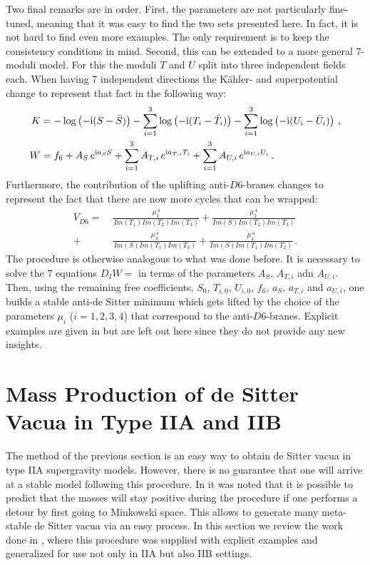 \documentclass[12pt]{report}
\newcommand{\bea}{\begin{equation}\begin{aligned}}
\newcommand{\eea}{\end{aligned}\end{equation}}
\def\rmi{{\rm i}}
\begin{document}
Two final remarks are in order. First, the parameters are not particularly fine-tuned, meaning that it was easy to find the two sets presented here. In fact, it is not hard to find even more examples. The only requirement is to keep the consistency conditions in mind. Second, this can be extended to a more general 7-moduli model. For this the moduli $T$ and $U$ split into three independent fields each. When having 7 independent directions the Kähler- and superpotential change to represent that fact in the following way:
\bea 
K&=  - \log\left(-\rmi (S-\bar{S})\right) - \sum_{i=1}^3  \log\left(-\rmi (T_i-\bar{T}_i)\right) - \sum_{i=1}^3 \log\left(-\rmi (U_i-\bar{U}_i)\right)\,,\\
W& = f_6 + A_{S}\, e^{\rmi a_S S} +  \sum_{i=1}^3 A_{T,i}\, e^{\rmi a_{T,i} T_i}+ \sum_{i=1}^3 A_{U,i}\, e^{\rmi a_{U,i} U_i}\,.
\eea
Furthermore, the contribution of the uplifting anti-$D6$-branes changes to represent the fact that there are now more cycles that can be wrapped:
\bea
V_{\overline{D6}} =\; &\frac{\mu_1^{\,4}}{Im(T_1)  Im(T_2)  Im(T_3)} +\frac{\mu_2^{\,4}}{Im(S)  Im(T_2)  Im(T_3)} \\+&\frac{\mu_3^{\,4}}{Im(S)  Im(T_1)  Im(T_3)} +\frac{\mu_4^{\,4}}{Im(S)  Im(T_1)  Im(T_2)}\,.
\eea
The procedure is otherwise analogous to what was done before. It is necessary to solve the 7 equations $D_IW=$ in terms of the parameters $A_S$, $A_{T,i}$ adn $A_{U,i}$. Then, using the remaining free coefficients, $S_0$, $T_{i,0}$, $U_{i,0}$, $f_6$, $a_S$, $a_{T,i}$ and $a_{U,i}$, one builds a stable anti-de Sitter minimum which gets lifted by the choice of the parameters $\mu_i$ ($i=1,2,3,4$) that correspond to the anti-$D6$-branes. Explicit examples are given in \cite{Cribiori:2019bfx} but are left out here since they do not provide any new insights.

\section{Mass Production of de Sitter Vacua in Type IIA and IIB}
\label{sec:massprod}
The method of the previous section is an easy way to obtain de Sitter vacua in type IIA supergravity models. However, there is no guarantee that one will arrive at a stable model following this procedure. In \cite{Kallosh:2019zgd} it was noted that it is possible to predict that the masses will stay positive during the procedure if one performs a detour by first going to Minkowski space. This allows to generate many meta-stable de Sitter vacua via an easy process. In this section we review the work done in \cite{Cribiori:2019drf}, where this procedure was supplied with explicit examples and generalized for use not only in IIA but also IIB settings.
\end{document}
